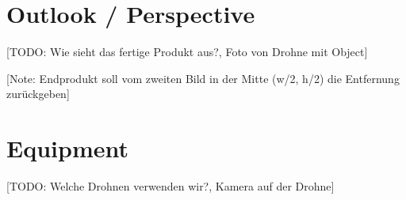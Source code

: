 \section{Outlook / Perspective}
[TODO: Wie sieht das fertige Produkt aus?, Foto von Drohne mit Object]

[Note: Endprodukt soll vom zweiten Bild in der Mitte (w/2, h/2) die Entfernung zurückgeben]

\section{Equipment}
[TODO: Welche Drohnen verwenden wir?, Kamera auf der Drohne]

\filbreak
